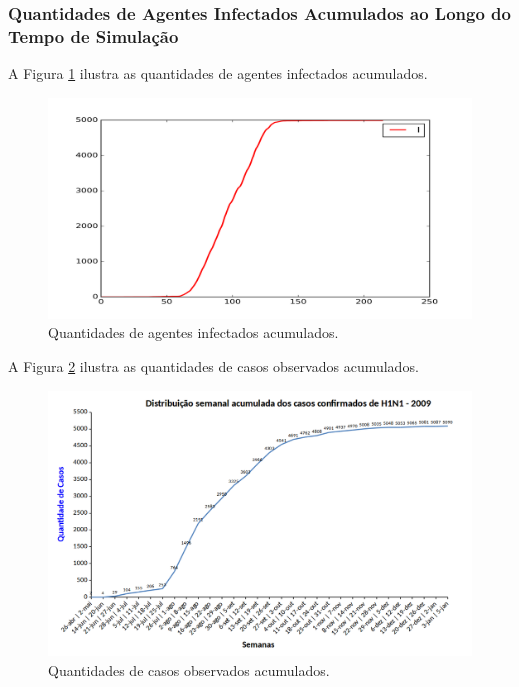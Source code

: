 \newpage

\subsubsection{Quantidades de Agentes Infectados Acumulados ao Longo do Tempo de Simulação}

A Figura \ref{fig:Quantidades_Agentes_Infectados_Acumulado_0001} ilustra as quantidades de agentes infectados acumulados.

\begin{figure}[H]
  \centering
  \includegraphics[width=1.0\textwidth]{Figuras/Resultados/0001/Saidas_GPU_BIT/MonteCarlo_0/Quantidades_Novo_Total_Acumulado_Total.png}
  \caption{Quantidades de agentes infectados acumulados.}
  \label{fig:Quantidades_Agentes_Infectados_Acumulado_0001}
\end{figure}

A Figura \ref{fig:Casos_Observados_Acumulados_0001} ilustra as quantidades de casos observados acumulados.

\begin{figure}[H]
  \centering
  \includegraphics[width=1.0\textwidth]{Figuras/Resultados/Observado/Casos_Observados_Acumulados.png}
  \caption{Quantidades de casos observados acumulados.}
  \label{fig:Casos_Observados_Acumulados_0001}
\end{figure}

